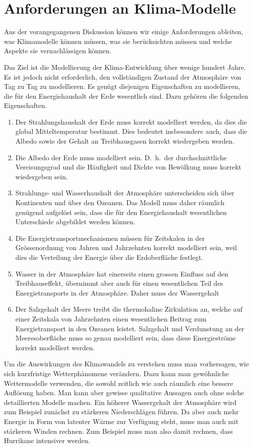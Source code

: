%
%
%

\section{Anforderungen an Klima-Modelle\label{section:anforderungen}}
Aus der vorangegangenen Diskussion können wir einige Anforderungen
ableiten, was Klimamodelle können müssen, was sie berücksichten
müssen und welche Aspekte sie vernachlässigen können.

Das Ziel ist die Modellierung der Klima-Entwicklung über wenige
hundert Jahre.
Es ist jedoch nicht erforderlich, den vollständigen Zustand der
Atmosphäre von Tag zu Tag zu modellieren.
Es genügt diejenigen Eigenschaften zu modellieren, die 
für den Energiehaushalt der Erde wesentlich sind.
Dazu gehören die folgenden Eigenschaften.
\begin{enumerate}
\item
Der Strahlungshaushalt der Erde muss korrekt modelliert werden,
da dies die global Mitteltemperatur bestimmt.
Dies bedeutet insbesondere auch, dass die Albedo sowie der Gehalt an
Treibhausgasen korrekt wiedergeben werden.
\item
Die Albedo der Erde muss modelliert sein. 
D.~h.~der durchschnittliche Vereisungsgrad und die Häufigkeit und
Dichte von Bewölkung muss korrekt wiedergeben sein.
\item
Strahlungs- und Wasserhaushalt der Atmosphäre unterscheiden sich
über Kontinenten und über den Ozeanen.
Das Modell muss daher räumlich genügend aufgelöst sein, dass die
für den Energiehaushalt wesentlichen Unterschiede abgebildet
werden können.
\item
Die Energietransportmechanismen müssen für Zeitskalen in der Grössenordnung
von Jahren und Jahrzehnten korrekt modelliert sein, weil dies die
Verteilung der Energie über die Erdoberfläche festlegt.
\item
Wasser in der Atmosphäre hat einerseits einen grossen Einfluss auf
den Treibhauseffekt, übernimmt aber auch für einen wesentlichen Teil
des Energietransports in der Atmosphäre.
Daher muss der Wassergehalt 
\item
Der Salzgehalt der Meere treibt die thermohaline Zirkulation an, welche
auf einer Zeitskala von Jahrzehnten einen wesentlichen Beitrag zum
Energietransport in den Ozeanen leistet.
Salzgehalt und Verdunstung an der Meeresoberfläche muss so genau
modelliert sein, dass diese Energieströme korrekt modelliert werden.
\end{enumerate}

Um die Auswirkungen des Klimawandels zu verstehen muss man vorhersagen,
wie sich kurzfristige Wetterphänomene verändern.
Dazu kann man gewöhnliche Wettermodelle verwenden, die sowohl zeitlich wie
auch räumlich eine bessere Auflösung haben.
Man kann aber gewisse qualitative Aussagen auch ohne solche detaillierten
Modelle machen.
Ein höherer Wassergehalt der Atmosphäre wird zum Beispiel zunächst
zu stärkeren Niederschlägen führen.
Da aber auch mehr Energie in Form von latenter Wärme zur Verfügung
steht, muss man auch mit stärkeren Winden rechnen.
Zum Beispiel muss man also damit rechnen, dass Hurrikane intensiver
werden.

